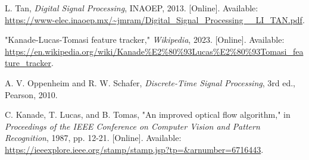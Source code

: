 \documentclass[journal]{IEEEtran}
\begin{document}



\begin{thebibliography}{1}

    L. Tan, \textit{Digital Signal Processing}, INAOEP, 2013. [Online]. Available: \url{https://www-elec.inaoep.mx/~jmram/Digital_Signal_Processing__LI_TAN.pdf}.
    
    "Kanade-Lucas-Tomasi feature tracker," \textit{Wikipedia}, 2023. [Online]. Available: \url{https://en.wikipedia.org/wiki/Kanade%E2%80%93Lucas%E2%80%93Tomasi_feature_tracker}.
    
    A. V. Oppenheim and R. W. Schafer, \textit{Discrete-Time Signal Processing}, 3rd ed., Pearson, 2010.

    C. Kanade, T. Lucas, and B. Tomas, "An improved optical flow algorithm," in \textit{Proceedings of the IEEE Conference on Computer Vision and Pattern Recognition}, 1987, pp. 12-21. [Online]. Available: \url{https://ieeexplore.ieee.org/stamp/stamp.jsp?tp=&arnumber=6716443}.
    
    
\end{thebibliography}
    
\end{document}
